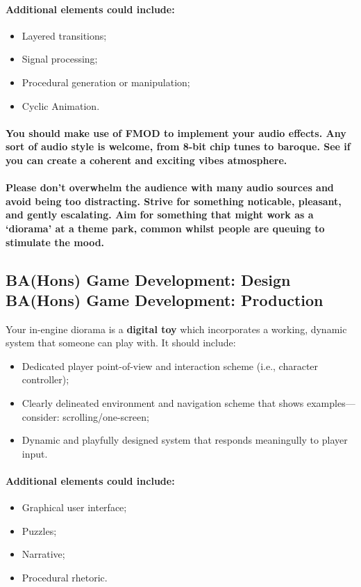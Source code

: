 \documentclass{../../fal_assignment}
\begin{document}
\paragraph{Additional elements could include:}
\begin{itemize}
\item Layered transitions;
\item Signal processing;
\item Procedural generation or manipulation; 
\item Cyclic Animation.
\end{itemize}
\paragraph{You should make use of FMOD to implement your audio effects. Any sort of audio style is welcome, from 8-bit chip tunes to baroque. See if you can create a coherent and exciting vibes atmosphere.}

\paragraph{Please don’t overwhelm the audience with many audio sources and avoid being too distracting. Strive for something noticable, pleasant, and gently escalating. Aim for something that might work as a ‘diorama’ at a theme park, common whilst people are queuing to stimulate the mood.}

\subsection*{BA(Hons) Game Development: Design \\ BA(Hons) Game Development: Production}

Your in-engine diorama is a \textbf{digital toy} which incorporates a working, dynamic system that someone can play with. It should include:
\begin{itemize}
\item Dedicated player point-of-view and interaction scheme (i.e., character controller);
\item Clearly delineated environment and navigation scheme that shows examples---consider: scrolling/one-screen; 
\item Dynamic and playfully designed system that responds meaningully to player input.
\end{itemize}
\paragraph{Additional elements could include:}
\begin{itemize}
\item Graphical user interface;
\item Puzzles;
\item Narrative; 
\item Procedural rhetoric.
\end{itemize}
\end{document}
